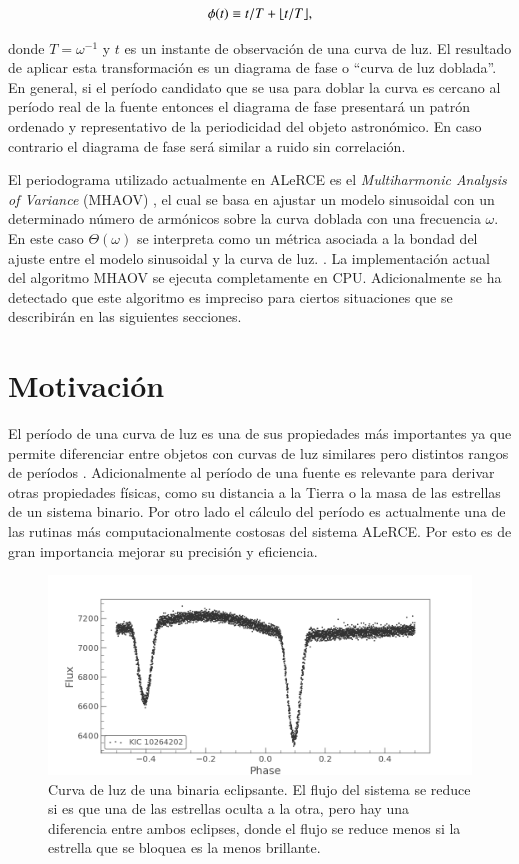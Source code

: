 \begin{equation}
\phi(t) \equiv t/T + \lfloor t/T\rfloor,    
\end{equation}

donde $T=\omega^{-1}$ y $t$ es un instante de observación de una curva de luz. El resultado de aplicar esta transformación es un diagrama de fase o ``curva de luz doblada''. En general, si el período candidato que se usa para doblar la curva es cercano al período real de la fuente entonces el diagrama de fase presentará un patrón ordenado y representativo de la periodicidad del objeto astronómico. En caso contrario el diagrama de fase será similar a ruido sin correlación.

El periodograma utilizado actualmente en ALeRCE es el {\it Multiharmonic Analysis of Variance} (MHAOV) \cite{MHAOV}, el cual se basa en ajustar un modelo sinusoidal con un determinado número de armónicos sobre la curva doblada con una frecuencia $\omega$. En este caso $\Theta(\omega)$ se interpreta como un métrica asociada a la bondad del ajuste entre el modelo sinusoidal y la curva de luz. \cite{MHAOV}. La implementación actual del algoritmo MHAOV se ejecuta completamente en CPU. Adicionalmente se ha detectado que este algoritmo es impreciso para ciertos situaciones que se describirán en las siguientes secciones.

\section{Motivación}\label{sec:motivacion}

El período de una curva de luz es una de sus propiedades más importantes ya que permite diferenciar entre objetos con curvas de luz similares pero distintos rangos de períodos \cite{eyer2008variable}. Adicionalmente al período de una fuente es relevante para derivar otras propiedades físicas, como su distancia a la Tierra \cite{catelan2004rr} o la masa de las estrellas de un sistema binario. Por otro lado el cálculo del período es actualmente una de las rutinas más computacionalmente costosas del sistema ALeRCE. Por esto es de gran importancia mejorar su precisión y eficiencia.

\begin{figure}[t]
    \centering
    \includegraphics[scale=0.5]{lightcurve.png}
    \caption{Curva de luz de una binaria eclipsante. El flujo del sistema se reduce si es que una de las estrellas oculta a la otra, pero hay una diferencia entre ambos eclipses, donde el flujo se reduce menos si la estrella que se bloquea es la menos brillante.}
    \label{fig:eclipsantes}
\end{figure}

